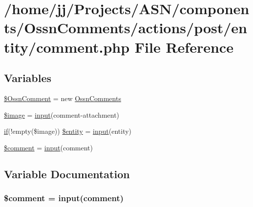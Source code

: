 \hypertarget{actions_2post_2entity_2comment_8php}{}\section{/home/jj/\+Projects/\+A\+S\+N/components/\+Ossn\+Comments/actions/post/entity/comment.php File Reference}
\label{actions_2post_2entity_2comment_8php}
\subsection*{Variables}
\begin{DoxyCompactItemize}
\item 
\hyperlink{actions_2post_2entity_2comment_8php_a72b9fc252071bb4b4ec3ba0e1dc24760}{\$\+Ossn\+Comment} = new \hyperlink{class_ossn_comments}{Ossn\+Comments}
\item 
\hyperlink{actions_2post_2entity_2comment_8php_aac6146b4cdec66c94263ddb55afd5946}{\$image} = \hyperlink{ossn_8lib_8input_8php_a64ebee98b041c4f75f71ed3cd73cc8ed}{input}(\textquotesingle{}comment-\/attachment\textquotesingle{})
\item 
\hyperlink{jquery_8tokeninput_8js_ad8dd46a3cbc004569e34401e9e71771a}{if}(!empty(\$image)) \hyperlink{actions_2post_2entity_2comment_8php_a8ba0408ab2cd233ae9c29c581120312b}{\$entity} = \hyperlink{ossn_8lib_8input_8php_a64ebee98b041c4f75f71ed3cd73cc8ed}{input}(\textquotesingle{}entity\textquotesingle{})
\item 
\hyperlink{actions_2post_2entity_2comment_8php_a536677acc0163c53c067316a97456e6c}{\$comment} = \hyperlink{ossn_8lib_8input_8php_a64ebee98b041c4f75f71ed3cd73cc8ed}{input}(\textquotesingle{}comment\textquotesingle{})
\end{DoxyCompactItemize}


\subsection{Variable Documentation}
\subsubsection[{\texorpdfstring{\$comment}{$comment}}]{\setlength{\rightskip}{0pt plus 5cm}\$comment = {\bf input}(\textquotesingle{}comment\textquotesingle{})}\hypertarget{actions_2post_2entity_2comment_8php_a536677acc0163c53c067316a97456e6c}{}\label{actions_2post_2entity_2comment_8php_a536677acc0163c53c067316a97456e6c}


